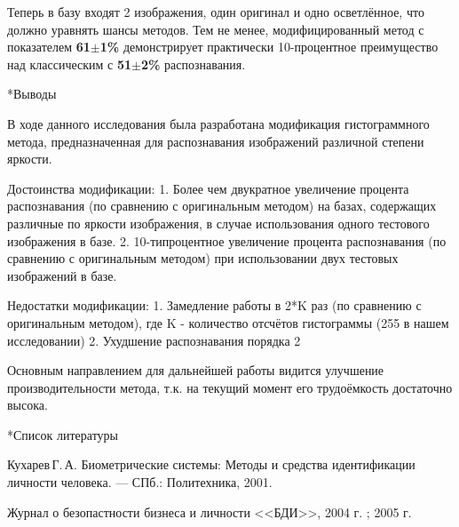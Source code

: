 \documentclass[a4paper,12pt,titlpage]{posobie}
\makeatletter
\newenvironment{enum}%
{\begin{list}{\arabic{enumi}.~}{\usecounter{enumi}\partopsep=0mm\itemsep=0mm\topsep=0mm\parsep=0mm\partopsep=0mm\parskip=0mm}}%
   {\end{list}}
\renewcommand{\section}{\@startsection{section}{1}{0.0cm}{0.5cm}{0.1cm}%
             {\fontsize{16}{16}\bf\selectfont }}
\makeatother
\begin{document}
Теперь в базу входят 2 изображения, один оригинал и одно осветлённое, что должно уравнять шансы методов. 
Тем не менее, модифицированный метод с показателем \textbf{61}$\pm$\textbf{1\%} демонстрирует практически 
10-процентное преимущество над классическим с \textbf{51}$\pm$\textbf{2\%} распознавания.

\section*{Выводы}

В ходе данного исследования была разработана модификация гистограммного метода, предназначенная для распознавания изображений различной степени яркости.

Достоинства модификации:
1. Более чем двукратное увеличение процента распознавания (по сравнению с оригинальным методом) на базах, содержащих различные по яркости изображения, в случае использования одного тестового изображения в базе.
2. 10-типроцентное увеличение процента распознавания (по сравнению с оригинальным методом) при использовании двух тестовых изображений в базе.

Недостатки модификации:
1. Замедление работы в 2*K раз (по сравнению с оригинальным методом), где K - количество отсчётов гистограммы (255 в нашем исследовании)
2. Ухудшение распознавания порядка 2%

Основным направлением для дальнейшей работы видится улучшение производительности метода, т.к. на текущий момент его трудоёмкость достаточно высока.

\section*{Список литературы}



\begin{enum}
\item
Кухарев\,Г.\,А. Биометрические системы: Методы и средства идентификации личности человека. --- СПб.: Политехника, 2001.
\item
Журнал о безопастности бизнеса и личности <<БДИ>>,  2004 г. ;  2005 г.
\end{enum}
\end{document}
